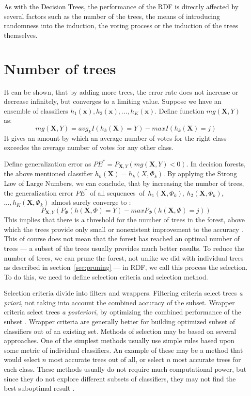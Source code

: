 \documentclass[thesis=B,english]{FITthesis}[2012/10/20]
\begin{document}
	As with the Decision Trees, the performance of the RDF is directly affected by several factors such as the number of the trees, the means of introducing randomness into the induction, the voting process or the induction of the trees themselves.

	\section{Number of trees}
	It can be shown, that by adding more trees, the error rate does not increase or decrease infinitely, but converges to a limiting value. Suppose we have an ensemble of classifiers \(h_1(\textbf{x}), h_2(\textbf{x}),\dots,h_K(\textbf{x})\). Define function \(\textit{mg}(\mathbf{X},Y)\) as:
	\[\textit{mg}(\mathbf{X},Y)=\textit{avg}_kI(h_k(\mathbf{X})=Y)-\textit{max}I(h_k(\mathbf{X})=j)\] It gives an amount by which an average number of votes for the right class exceedes the average number of votes for any other class. 

	Define generalization error as \(PE^*=P_{\mathbf{X},Y}(\textit{mg}(\mathbf{X},Y) < 0)\). In decision forests, the above mentioned classifier \(h_k(\textbf{X})=h_k(X, \Phi_k)\). By applying the Strong Law of Large Numbers, we can conclude, that by increasing the number of trees, the generalization error \(PE^*\) of all sequences~of~\(h_1(\mathbf{X},\Phi_k)\), \(h_2(\mathbf{X}, \Phi_k)\),~\(\dots, h_K(\mathbf{X}, \Phi_k)\) almost surely converge to \cite{BR01}:
	\[
	P_{\mathbf{X},Y}(P_{\Phi}(h(\mathbf{X}, \Phi)=Y)-\textit{max}P_{\Phi}(h(\mathbf{X}, \Phi)=j))
	\]
	This implies that there is a threshold for the number of trees in the forest, above which the trees provide only small or nonexistent improvement to the accuracy \cite{SELECTION_OF_DT}. This of course does not mean that the forest has reached an optimal number of trees --- a subset of the trees usually provides much better results. To reduce the number of trees, we can prune the forest, not unlike we did with individual trees as described in section~\ref{sec:pruning} --- in RDF, we call this process the selection. To do this, we need to define selection criteria and selection method.

	Selection criteria divide into filters and wrappers. Filtering criteria select trees \textit{a priori}, not taking into account the combined accuracy of the subset. Wrapper criteria select trees \textit{a posteriori}, by optimizing the combined performance of the subset \cite{PRUNING_RDF}. Wrapper criteria are generally better for building optimized subset of classifiers out of an existing set. Methods of selection may be based on several approaches.
	One of the simplest methods usually use simple rules based upon some metric of individual classifiers. An example of these may be a method that would select \(n\) most accurate trees out of all, or select \(n\) most accurate trees for each class. These methods usually do not require much computational power, but since they do not explore different subsets of classifiers, they may not find the best suboptimal result \cite{PRUNING_RDF}. 
	
\end{document}
